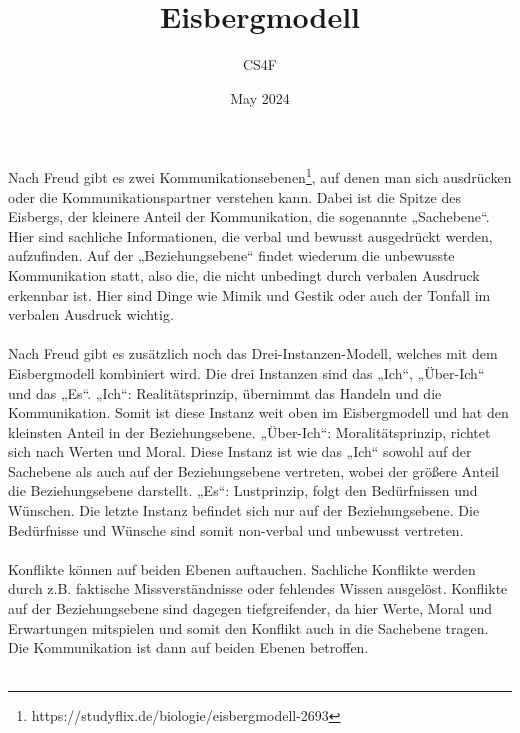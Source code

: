 \documentclass[a4paper]{article}
\title{\vspace{-2cm}Eisbergmodell}
\author{CS4F}
\date{May 2024}
\begin{document}
\maketitle


Nach Freud gibt es zwei Kommunikationsebenen\footnote{https://studyflix.de/biologie/eisbergmodell-2693}, auf denen man sich ausdrücken oder die Kommunikationspartner verstehen kann. Dabei ist die Spitze des Eisbergs, der kleinere Anteil der Kommunikation, die sogenannte „Sachebene“. Hier sind sachliche Informationen, die verbal und bewusst ausgedrückt werden, aufzufinden. Auf der „Beziehungsebene“ findet wiederum die unbewusste Kommunikation statt, also die, die nicht unbedingt durch verbalen Ausdruck erkennbar ist. Hier sind Dinge wie Mimik und Gestik oder auch der Tonfall im verbalen Ausdruck wichtig. \\\\

Nach Freud gibt es zusätzlich noch das Drei-Instanzen-Modell, welches mit dem Eisbergmodell kombiniert wird. Die drei Instanzen sind das „Ich“, „Über-Ich“ und das „Es“.
„Ich“: Realitätsprinzip, übernimmt das Handeln und die Kommunikation. Somit ist diese Instanz weit oben im Eisbergmodell und hat den kleinsten Anteil in der Beziehungsebene.
„Über-Ich“: Moralitätsprinzip, richtet sich nach Werten und Moral. Diese Instanz ist wie das „Ich“ sowohl auf der Sachebene als auch auf der Beziehungsebene vertreten, wobei der größere Anteil die Beziehungsebene darstellt.
„Es“: Lustprinzip, folgt den Bedürfnissen und Wünschen. Die letzte Instanz befindet sich nur auf der Beziehungsebene. Die Bedürfnisse und Wünsche sind somit non-verbal und unbewusst vertreten.\\\\

Konflikte können auf beiden Ebenen auftauchen. Sachliche Konflikte werden durch z.B. faktische Missverständnisse oder fehlendes Wissen ausgelöst. Konflikte auf der Beziehungsebene sind dagegen tiefgreifender, da hier Werte, Moral und Erwartungen mitspielen und somit den Konflikt auch in die Sachebene tragen. Die Kommunikation ist dann auf beiden Ebenen betroffen. \\\\
\end{document}
